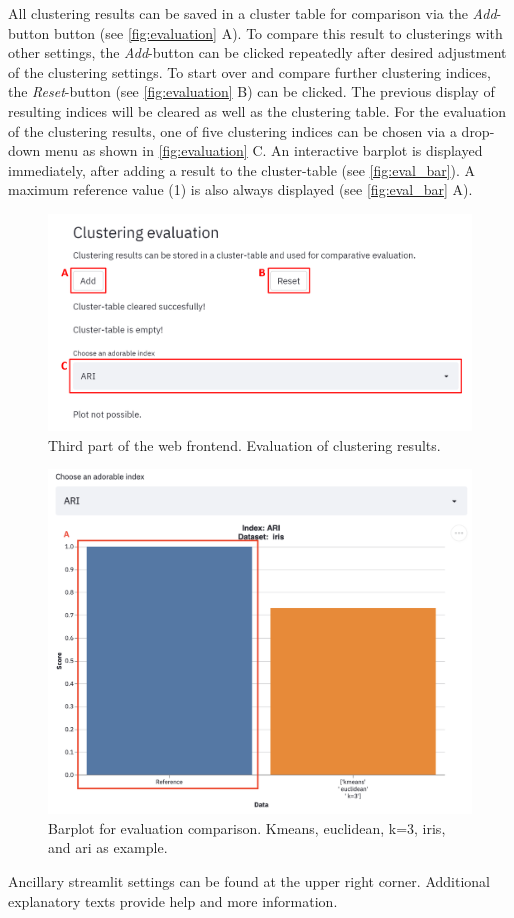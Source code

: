 All clustering results can be saved in a cluster table for comparison via the \textit{Add}-button button (see \autoref{fig:evaluation} A). To compare this result to clusterings with other settings, the \textit{Add}-button can be clicked repeatedly after desired adjustment of the clustering settings. To start over and compare further clustering indices, the \textit{Reset}-button (see \autoref{fig:evaluation} B) can be clicked. The previous display of resulting indices will be cleared as well as the clustering table.
For the evaluation of the clustering results, one of five clustering indices can be chosen via a drop-down menu as shown in \autoref{fig:evaluation} C. An interactive barplot is displayed immediately, after adding a result to the cluster-table (see \autoref{fig:eval_bar}). A maximum reference value (1) is also always displayed (see \autoref{fig:eval_bar} A).
\begin{figure}[H]
	\centering
	\includegraphics[width=\linewidth]{modules/web_frontend/evaluation_letters}
	\caption{Third part of the web frontend. Evaluation of clustering results.}\label{fig:evaluation}
\end{figure}

\begin{figure}[H]
	\centering
	\includegraphics[width=\linewidth]{modules/web_frontend/eval_bar.png}
	\caption{Barplot for evaluation comparison. Kmeans, euclidean, k=3, iris, and \acrshort{ari} as example.}\label{fig:eval_bar}
\end{figure}


Ancillary streamlit settings can be found at the upper right corner. Additional explanatory texts provide help and more information. \\

